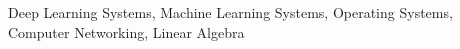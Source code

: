{Deep Learning Systems, Machine Learning Systems, Operating Systems, Computer Networking, Linear Algebra}
